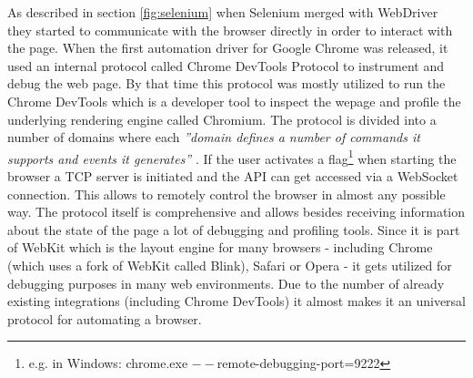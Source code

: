 As described in section \ref{fig:selenium} when Selenium merged with WebDriver they started to communicate with the browser directly in order to interact with the page. When the first automation driver for Google Chrome was released, it used an internal protocol called Chrome DevTools Protocol to instrument and debug the web page. By that time this protocol was mostly utilized to run the Chrome DevTools which is a developer tool to inspect the wepage and profile the underlying rendering engine called Chromium. The protocol is divided into a number of domains where each \textit{''domain defines a number of commands it supports and events it generates''} \cite{devtoolsprotocol}. If the user activates a flag\footnote{e.g. in Windows: chrome.exe $--$remote-debugging-port=9222} when starting the browser a TCP server is initiated and the API can get accessed via a WebSocket connection. This allows to remotely control the browser in almost any possible way. The protocol itself is comprehensive and allows besides receiving information about the state of the page a lot of debugging and profiling tools. Since it is part of WebKit which is the layout engine for many browsers - including Chrome (which uses a fork of WebKit called Blink), Safari or Opera - it gets utilized for debugging purposes in many web environments. Due to the number of already existing integrations (including Chrome DevTools) it almost makes it an universal protocol for automating a browser.
